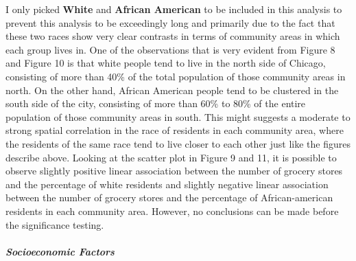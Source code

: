 \documentclass[
]{article}
\begin{document}
I only picked \textbf{White} and \textbf{African American} to be
included in this analysis to prevent this analysis to be exceedingly
long and primarily due to the fact that these two races show very clear
contrasts in terms of community areas in which each group lives in. One
of the observations that is very evident from Figure 8 and Figure 10 is
that white people tend to live in the north side of Chicago, consisting
of more than 40\% of the total population of those community areas in
north. On the other hand, African American people tend to be clustered
in the south side of the city, consisting of more than 60\% to 80\% of
the entire population of those community areas in south. This might
suggests a moderate to strong spatial correlation in the race of
residents in each community area, where the residents of the same race
tend to live closer to each other just like the figures describe above.
Looking at the scatter plot in Figure 9 and 11, it is possible to
observe slightly positive linear association between the number of
grocery stores and the percentage of white residents and slightly
negative linear association between the number of grocery stores and the
percentage of African-american residents in each community area.
However, no conclusions can be made before the significance testing.

\hypertarget{socioeconomic-factors}{%
\subparagraph{Socioeconomic Factors}\label{socioeconomic-factors}}
\end{document}
